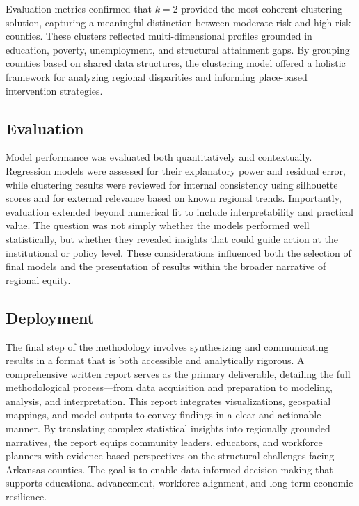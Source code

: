 \documentclass{llncs}
\begin{document}
Evaluation metrics confirmed that $k=2$ provided the most coherent clustering solution, capturing a meaningful distinction between moderate-risk and high-risk counties. These clusters reflected multi-dimensional profiles grounded in education, poverty, unemployment, and structural attainment gaps. By grouping counties based on shared data structures, the clustering model offered a holistic framework for analyzing regional disparities and informing place-based intervention strategies.

\subsection{Evaluation}
Model performance was evaluated both quantitatively and contextually. Regression models were assessed for their explanatory power and residual error, while clustering results were reviewed for internal consistency using silhouette scores and for external relevance based on known regional trends. Importantly, evaluation extended beyond numerical fit to include interpretability and practical value. The question was not simply whether the models performed well statistically, but whether they revealed insights that could guide action at the institutional or policy level. These considerations influenced both the selection of final models and the presentation of results within the broader narrative of regional equity.

\subsection{Deployment}
The final step of the methodology involves synthesizing and communicating results in a format that is both accessible and analytically rigorous. A comprehensive written report serves as the primary deliverable, detailing the full methodological process—from data acquisition and preparation to modeling, analysis, and interpretation. This report integrates visualizations, geospatial mappings, and model outputs to convey findings in a clear and actionable manner. By translating complex statistical insights into regionally grounded narratives, the report equips community leaders, educators, and workforce planners with evidence-based perspectives on the structural challenges facing Arkansas counties. The goal is to enable data-informed decision-making that supports educational advancement, workforce alignment, and long-term economic resilience.
\end{document}
